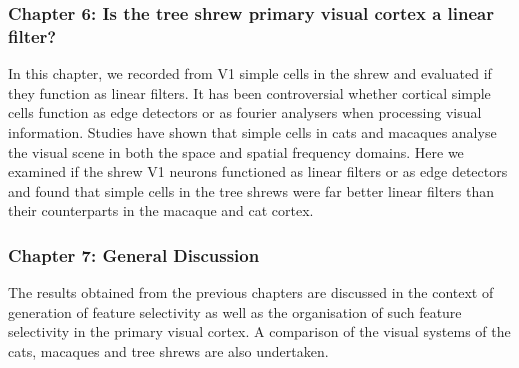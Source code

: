 \documentclass [12] {report}
\begin{document}
	\subsubsection{Chapter 6: Is the tree shrew primary visual cortex a linear filter?}
	
	In this chapter, we recorded from V1 simple cells in the shrew and evaluated if they function as linear filters. It has been controversial whether cortical simple cells function as edge detectors or as fourier analysers when processing visual information. Studies have shown that simple cells in cats and macaques analyse the visual scene in both the space and spatial frequency domains. Here we examined if the shrew V1 neurons functioned as linear filters or as edge detectors and found that simple cells in the tree shrews were far better linear filters than their counterparts in the macaque and cat cortex.
	
	\subsubsection{Chapter 7: General Discussion}
	
	The results obtained from the previous chapters are discussed in the context of generation of feature selectivity as well as the organisation of such feature selectivity in the primary visual cortex. A comparison of the visual systems of the cats, macaques and tree shrews are also undertaken.
\end{document}
